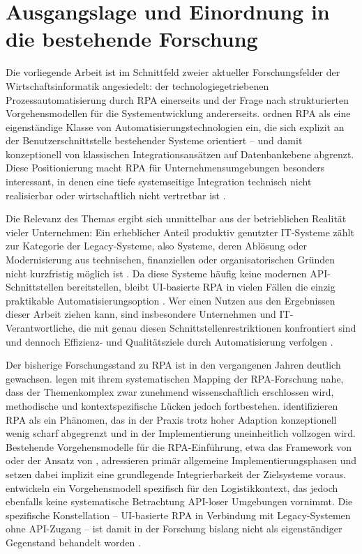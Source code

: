 \newpage
\section{Ausgangslage und Einordnung in die bestehende Forschung}

Die vorliegende Arbeit ist im Schnittfeld zweier aktueller Forschungsfelder 
der Wirtschaftsinformatik angesiedelt: der technologiegetriebenen 
Prozessautomatisierung durch \ac{RPA} einerseits 
und der Frage nach strukturierten Vorgehensmodellen für die 
Systementwicklung andererseits. \textcite{VanDerAalst2018} ordnen \ac{RPA} 
als eine eigenständige Klasse von Automatisierungstechnologien ein, 
die sich explizit an der Benutzerschnittstelle bestehender Systeme 
orientiert – und damit konzeptionell von klassischen 
Integrationsansätzen auf Datenbankebene abgrenzt. Diese Positionierung 
macht \ac{RPA} für Unternehmensumgebungen besonders interessant, in denen 
eine tiefe systemseitige Integration technisch nicht realisierbar oder 
wirtschaftlich nicht vertretbar ist \autocite[Vgl.][S.~3]{HermJaniesch2022}.

Die Relevanz des Themas ergibt sich unmittelbar aus der 
betrieblichen Realität vieler Unternehmen: Ein erheblicher Anteil 
produktiv genutzter IT-Systeme zählt zur Kategorie der Legacy-Systeme, 
also Systeme, deren Ablösung oder Modernisierung aus technischen, 
finanziellen oder organisatorischen Gründen nicht kurzfristig möglich 
ist \autocite[Vgl.][S.~103]{Bisbal1999}. Da diese Systeme häufig keine modernen 
\acs{API}-Schnittstellen bereitstellen, bleibt \acs{UI}-basierte \ac{RPA} in vielen 
Fällen die einzig praktikable Automatisierungsoption \autocite[Vgl.][S.~104]{RutschiDibbern2020}. Wer einen Nutzen 
aus den Ergebnissen dieser Arbeit ziehen kann, sind insbesondere 
Unternehmen und IT-Verantwortliche, die mit genau diesen 
Schnittstellenrestriktionen konfrontiert sind und dennoch Effizienz- 
und Qualitätsziele durch Automatisierung verfolgen \autocite[Vgl.][S.~1]{Lindgren2026}.

Der bisherige Forschungsstand zu \ac{RPA} ist in den vergangenen Jahren 
deutlich gewachsen. \textcite{Wewerka2023} legen mit ihrem 
systematischen Mapping der \acs{RPA}-Forschung nahe, dass der 
Themenkomplex zwar zunehmend wissenschaftlich erschlossen wird, 
methodische und kontextspezifische Lücken jedoch fortbestehen. 
\textcite{Syed2020} identifizieren \ac{RPA} als ein Phänomen, das in 
der Praxis trotz hoher Adaption konzeptionell wenig scharf 
abgegrenzt und in der Implementierung uneinheitlich vollzogen wird. 
Bestehende Vorgehensmodelle für die \acs{RPA}-Einführung, etwa das 
Framework von \textcite{HermJaniesch2022} oder der Ansatz von 
\textcite{SantosPereira2020}, adressieren primär allgemeine 
Implementierungsphasen und setzen dabei implizit eine grundlegende 
Integrierbarkeit der Zielsysteme voraus. \textcite{KrakauFeldmann2023} 
entwickeln ein Vorgehensmodell spezifisch für den Logistikkontext, 
das jedoch ebenfalls keine systematische Betrachtung \acs{API}-loser 
Umgebungen vornimmt. Die spezifische Konstellation – \acs{UI}-basierte 
\ac{RPA} in Verbindung mit Legacy-Systemen ohne \acs{API}-Zugang – ist damit 
in der Forschung bislang nicht als eigenständiger Gegenstand 
behandelt worden \autocite[Vgl.][S.~1]{Wewerka2023}.

